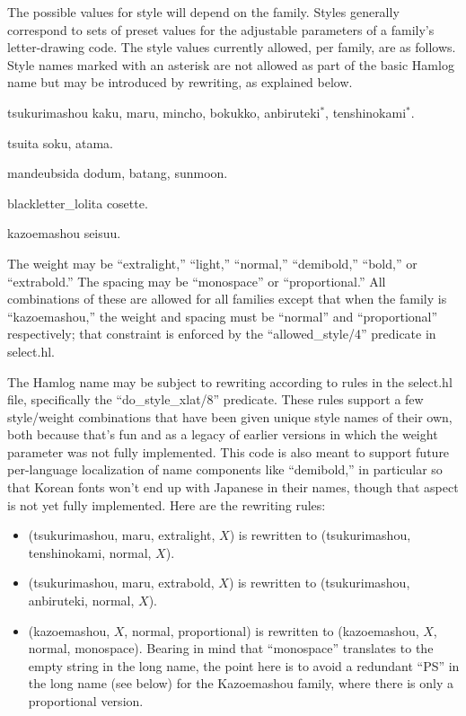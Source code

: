 \documentclass[14pt]{extarticle}
\begin{document}
The possible values for style will depend on the family.  Styles generally
correspond to sets of preset values for the adjustable parameters of a
family's letter-drawing code.  The style values currently allowed, per
family, are as follows.  Style names marked with an asterisk are not allowed
as part of the basic Hamlog name but may be introduced by rewriting, as
explained below.
\begin{description}
  \item{\anbiruteki tsukurimashou} kaku, maru, mincho, bokukko,
    anbiruteki$^*$, tenshinokami$^*$.
  \item{\anbiruteki tsuita} soku, atama.
  \item{\anbiruteki mandeubsida} dodum, batang, sunmoon.
  \item{\anbiruteki blackletter\_lolita} cosette.
  \item{\anbiruteki kazoemashou} seisuu.
\end{description}

The weight may be ``extralight,'' ``light,'' ``normal,'' ``demibold,''
``bold,'' or ``extrabold.''  The spacing may be ``monospace'' or
``proportional.''  All combinations of these are allowed for all families
except that when the family is ``kazoemashou,'' the weight and spacing must
be ``normal'' and ``proportional'' respectively; that constraint is
enforced by the ``allowed\_style/4'' predicate in select.hl.

The Hamlog name may be subject to rewriting according to rules in the
select.hl file, specifically the ``do\_style\_xlat/8'' predicate.  These
rules support a few style/weight combinations that have been given unique
style names of their own, both because that's fun and as a legacy of earlier
versions in which the weight parameter was not fully implemented.  This code
is also meant to support future per-language localization of name components
like ``demibold,'' in particular so that Korean fonts won't end up with
Japanese in their names, though that aspect is not yet fully implemented.
Here are the rewriting rules:
\begin{itemize}
  \item (tsukurimashou, maru, extralight, $X$) is rewritten to
    (tsukurimashou, tenshinokami, normal, $X$).
  \item (tsukurimashou, maru, extrabold, $X$) is rewritten to
    (tsukurimashou, anbiruteki, normal, $X$).
  \item (kazoemashou, $X$, normal, proportional) is rewritten to
    (kazoemashou, $X$, normal, monospace).  Bearing in mind that ``monospace''
    translates to the empty string in the long name, the point here is to
    avoid a redundant ``PS'' in the long name (see below) for the
    Kazoemashou family, where there is only a proportional version.
\end{itemize}
\end{document}
